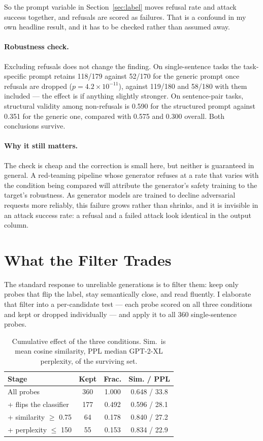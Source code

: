 \documentclass[11pt]{article}
\begin{document}
So the prompt variable in Section~\ref{sec:label} moves refusal rate and attack
success together, and refusals are scored as failures. That is a confound in my
own headline result, and it has to be checked rather than assumed away.

\paragraph{Robustness check.}
Excluding refusals does not change the finding. On single-sentence tasks the
task-specific prompt retains 118/179 against 52/170 for the generic prompt once
refusals are dropped ($p = 4.2\times10^{-11}$), against 119/180 and 58/180 with
them included --- the effect is if anything slightly stronger. On sentence-pair
tasks, structural validity among non-refusals is 0.590 for the structured prompt
against 0.351 for the generic one, compared with 0.575 and 0.300 overall. Both
conclusions survive.

\paragraph{Why it still matters.}
The check is cheap and the correction is small here, but neither is guaranteed in
general. A red-teaming pipeline whose generator refuses at a rate that varies
with the condition being compared will attribute the generator's safety training
to the target's robustness. As generator models are trained to decline
adversarial requests more reliably, this failure grows rather than shrinks, and
it is invisible in an attack success rate: a refusal and a failed attack look
identical in the output column.

\section{What the Filter Trades}
\label{sec:filter}

The standard response to unreliable generations is to filter them: keep only
probes that flip the label, stay semantically close, and read fluently. I
elaborate that filter into a per-candidate test --- each probe scored on all
three conditions and kept or dropped individually --- and apply it to all 360
single-sentence probes.

\begin{table}[t]
\centering
\small
\begin{tabular}{lccc}
\toprule
Stage & Kept & Frac. & Sim. / PPL \\
\midrule
All probes               & 360 & 1.000 & 0.648 / 33.8 \\
\;+ flips the classifier & 177 & 0.492 & 0.596 / 28.1 \\
\;+ similarity $\geq$ 0.75 & 64 & 0.178 & 0.840 / 27.2 \\
\;+ perplexity $\leq$ 150  & 55 & 0.153 & 0.834 / 22.9 \\
\bottomrule
\end{tabular}
\caption{Cumulative effect of the three conditions. Sim.\ is mean cosine
similarity, PPL median GPT-2-XL perplexity, of the surviving set.}
\label{tab:filter}
\end{table}
\end{document}

